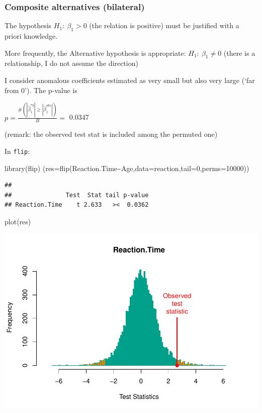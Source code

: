 \documentclass[
]{article}
\newenvironment{Shaded}{\begin{snugshade}}{\end{snugshade}}
\newcommand{\AttributeTok}[1]{\textcolor[rgb]{0.77,0.63,0.00}{#1}}
\newcommand{\DecValTok}[1]{\textcolor[rgb]{0.00,0.00,0.81}{#1}}
\newcommand{\FunctionTok}[1]{\textcolor[rgb]{0.00,0.00,0.00}{#1}}
\newcommand{\NormalTok}[1]{#1}
\newcommand{\SpecialCharTok}[1]{\textcolor[rgb]{0.00,0.00,0.00}{#1}}
\begin{document}
\hypertarget{composite-alternatives-bilateral}{%
\subsubsection{Composite alternatives
(bilateral)}\label{composite-alternatives-bilateral}}

The hypothesis \(H_1: \ \beta_1 >0\) (the relation is positive) must be
justified with a priori knowledge.

More frequently, the Alternative hypothesis is appropriate:
\(H_1: \ \beta_1 \neq 0\) (there is a relationship, I do not assume the
direction)

I consider anomalous coefficients estimated as very small but also very
large (`far from 0'). The p-value is

\(p=\frac{\#(|\hat{\beta}_1^{*b} | \geq|\hat{\beta}_1^{obs}|)}{B}=\)
0.0347

(remark: the observed test stat is included among the permuted one)

In \texttt{flip}:

\begin{Shaded}
\begin{Highlighting}[]
\FunctionTok{library}\NormalTok{(flip)}
\NormalTok{(}\AttributeTok{res=}\FunctionTok{flip}\NormalTok{(Reaction.Time}\SpecialCharTok{\textasciitilde{}}\NormalTok{Age,}\AttributeTok{data=}\NormalTok{reaction,}\AttributeTok{tail=}\DecValTok{0}\NormalTok{,}\AttributeTok{perms=}\DecValTok{10000}\NormalTok{))}
\end{Highlighting}
\end{Shaded}

\begin{verbatim}
## 
##               Test  Stat tail p-value
## Reaction.Time    t 2.633   ><  0.0362
\end{verbatim}

\begin{Shaded}
\begin{Highlighting}[]
\FunctionTok{plot}\NormalTok{(res)}
\end{Highlighting}
\end{Shaded}

\begin{center}\includegraphics{perm_files/figure-latex/unnamed-chunk-16-1} \end{center}
\end{document}
